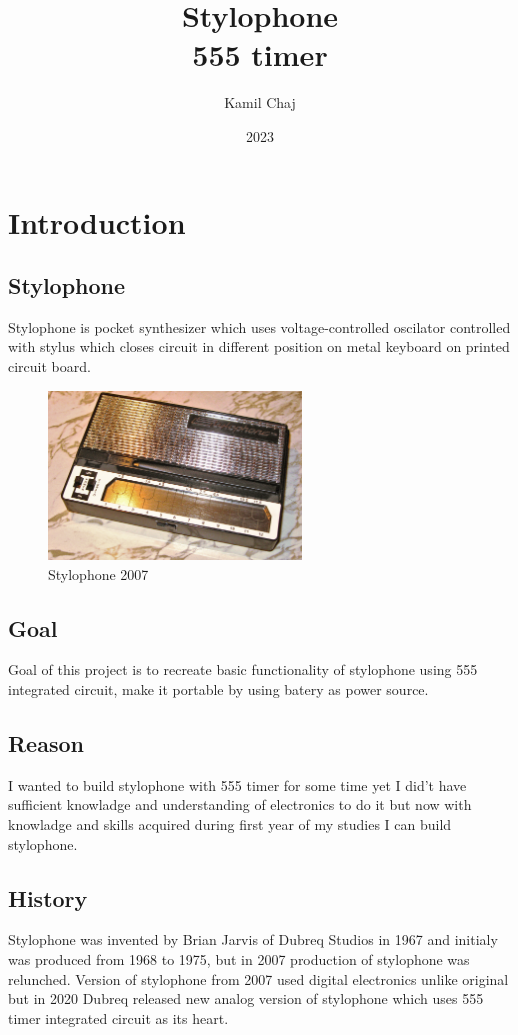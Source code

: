 \documentclass[english,10pt,a4paper]{article}
\title{Stylophone\\
	\normalsize 555 timer}
\author{Kamil Chaj}
\date{2023}
\begin{document}
	\maketitle
	\tableofcontents
	\newpage
	
	\section{Introduction}
	
	\subsection{Stylophone}
	Stylophone is pocket synthesizer which uses voltage-controlled oscilator controlled with stylus which closes circuit in different position on metal keyboard on printed circuit board.
	\begin{figure}[H]
		\centering
		\includegraphics[width=0.6\textwidth]{img/Modern_Stylophone.jpg}
		\caption{Stylophone 2007}
	\end{figure}
	
	\subsection{Goal}
	Goal of this project is to recreate basic functionality of stylophone using 555 integrated circuit, make it portable by using batery as power source.
	
	\subsection{Reason}
	I wanted to build stylophone with 555 timer for some time yet I did't have sufficient knowladge and understanding of electronics to do it but now with knowladge and skills acquired during first year of my studies I can build stylophone.
	
	\subsection{History}
	Stylophone was invented by Brian Jarvis of Dubreq Studios in 1967 and initialy was produced from 1968 to 1975, but in 2007 production of stylophone was relunched. Version of stylophone from 2007 used digital electronics unlike original but in 2020 Dubreq released new analog version of stylophone which uses 555 timer integrated circuit as its heart.
	
\end{document}
